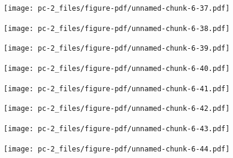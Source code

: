 \documentclass[
  letterpaper,
  DIV=11,
  numbers=noendperiod]{scrreprt}
\begin{document}
\begin{figure}[H]

{\centering \texttt{[image: pc-2\_files/figure-pdf/unnamed-chunk-6-37.pdf]}

}

\end{figure}

\begin{figure}[H]

{\centering \texttt{[image: pc-2\_files/figure-pdf/unnamed-chunk-6-38.pdf]}

}

\end{figure}

\begin{figure}[H]

{\centering \texttt{[image: pc-2\_files/figure-pdf/unnamed-chunk-6-39.pdf]}

}

\end{figure}

\begin{figure}[H]

{\centering \texttt{[image: pc-2\_files/figure-pdf/unnamed-chunk-6-40.pdf]}

}

\end{figure}

\begin{figure}[H]

{\centering \texttt{[image: pc-2\_files/figure-pdf/unnamed-chunk-6-41.pdf]}

}

\end{figure}

\begin{figure}[H]

{\centering \texttt{[image: pc-2\_files/figure-pdf/unnamed-chunk-6-42.pdf]}

}

\end{figure}

\begin{figure}[H]

{\centering \texttt{[image: pc-2\_files/figure-pdf/unnamed-chunk-6-43.pdf]}

}

\end{figure}

\begin{figure}[H]

{\centering \texttt{[image: pc-2\_files/figure-pdf/unnamed-chunk-6-44.pdf]}

}

\end{figure}
\end{document}
